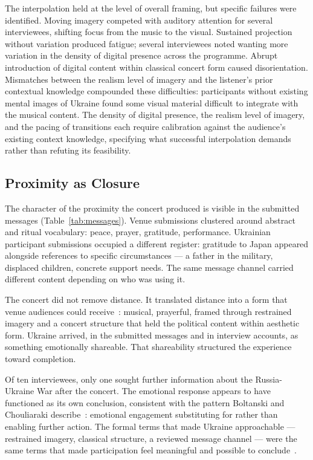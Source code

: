\documentclass[sigconf,anonymous,review]{acmart}
\begin{document}
The interpolation held at the level of overall framing, but specific failures were
identified.
Moving imagery competed with auditory attention for several interviewees, shifting focus
from the music to the visual.
Sustained projection without variation produced fatigue; several interviewees noted
wanting more variation in the density of digital presence across the programme.
Abrupt introduction of digital content within classical concert form caused disorientation.
Mismatches between the realism level of imagery and the listener's prior contextual
knowledge compounded these difficulties: participants without existing mental images of
Ukraine found some visual material difficult to integrate with the musical content.
The density of digital presence, the realism level of imagery, and the pacing of
transitions each require calibration against the audience's existing context knowledge,
specifying what successful interpolation demands rather than refuting its feasibility.

\subsection{Proximity as Closure}

The character of the proximity the concert produced is visible in the submitted messages
(Table~\ref{tab:messages}).
Venue submissions clustered around abstract and ritual vocabulary: peace, prayer,
gratitude, performance.
Ukrainian participant submissions occupied a different register: gratitude to Japan appeared
alongside references to specific circumstances --- a father in the military, displaced
children, concrete support needs.
The same message channel carried different content depending on who was using it.

The concert did not remove distance.
It translated distance into a form that venue audiences could
receive~\cite{Heidegger1971}: musical, prayerful, framed through restrained imagery
and a concert structure that held the political content within aesthetic form.
Ukraine arrived, in the submitted messages and in interview accounts, as something
emotionally shareable.
That shareability structured the experience toward completion.

Of ten interviewees, only one sought further information about the Russia-Ukraine War
after the concert.
The emotional response appears to have functioned as its own conclusion, consistent with
the pattern Boltanski and Chouliaraki describe~\cite{Boltanski1999,Chouliaraki2013}:
emotional engagement substituting for rather than enabling further action.
The formal terms that made Ukraine approachable --- restrained imagery, classical structure,
a reviewed message channel --- were the same terms that made participation feel meaningful
and possible to conclude~\cite{Bishop2004}.
\end{document}
